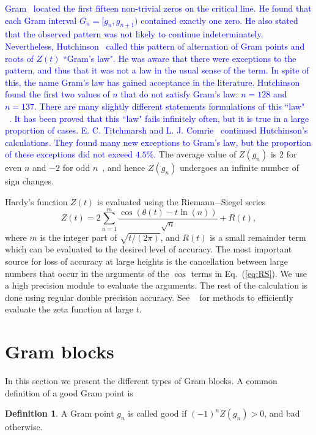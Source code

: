 \documentclass[twoside]{article}
\theoremstyle{definition}
\newtheorem{defn}{Definition}
\begin{document}
\textcolor{blue}{
Gram~\cite{Gram 1903} located the first fifteen non-trivial zeros on the critical line. He found that each Gram interval $G_n = [g_n,g_{n+1})$
contained exactly one zero. He also stated that the observed pattern was not likely to continue indeterminately. 
Nevertheless, Hutchinson~\cite{Hutchinson 1925} called this pattern of alternation of Gram points and roots of $Z(t)$ ``Gram's law". He was aware that there were exceptions to the pattern, and thus that it was not a law in the usual sense of the term. In spite of this, the name Gram's law has gained acceptance in the literature. Hutchinson found the first two values of $n$ that do not satisfy Gram's
law: $n = 128$ and $n = 137$.
There are many slightly different statements formulations of this ``law" ~\cite{Korolev}.
It has been proved that this ``law" fails infinitely often, but it is true in a large proportion of cases. E. C. Titchmarsh and L. J. Comrie~\cite{Titchmarsh 1935,Titchmarsh 1936} continued Hutchinson's calculations. They found many new exceptions
to Gram's law, but the proportion of these exceptions did not exceed $4.5\%$.
}
The average value of $Z(g_n)$ is $2$ for even $n$ and $-2$ for odd $n$~\cite{Titchmarsh 1986},
and hence $Z(g_n)$ undergoes an infinite number of sign changes.

Hardy's function $Z(t)$  is evaluated using the Riemann$-$Siegel series
\begin{equation}
Z(t) = 2\sum^{m}_{n=1}\frac{\cos(\theta(t) - t \ln (n))}{\sqrt{n}} + R(t), 
\label{eq:RS}
\end{equation}
where $m$ is the integer part of $\sqrt{t/(2\pi)}$, and $R(t)$ is a small remainder
term which can be evaluated to the desired level of accuracy. The most important 
source for loss of accuracy at large heights is the cancellation between
large numbers that occur in the arguments of the $\cos$ terms in Eq.~(\ref{eq:RS}). We 
use a high precision module to evaluate the arguments. The rest of the calculation
is done using regular double precision accuracy. See ~\cite{Odlyzko 1992,hiary,gourdon} for methods to efficiently evaluate the zeta function at large $t$.

\section{\label{sec4}Gram blocks}


In this section we present the different types of Gram blocks. A common definition of a good Gram point is
\begin{defn}\label{good1}
A Gram point $g_n$ is called good if $(-1)^nZ(g_n) > 0$, and bad otherwise.
\end{defn}
\end{document}
